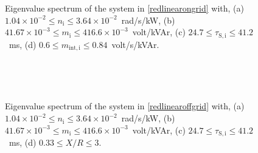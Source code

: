 \documentclass[journal]{IEEEtran}
\begin{document}
\begin{figure}[t]
	\centering
	~
		
	~
	\caption{Eigenvalue spectrum of the system in \eqref{redlinearongrid} with, (a) $1.04\times 10^{-2}\le n_\mathrm{i} \le 3.64\times 10^{-2}$~rad/s/kW, (b) $41.67\times 10^{-3} \le m_\mathrm{i} \le 416.6\times 10^{-3}$~volt/kVAr, (c) $24.7 \le \tau_\mathrm{S,i} \le 41.2$~ms, (d) $0.6 \le m_\mathrm{int,i} \le 0.84$~volt/s/kVAr.}
	\label{fig:locusgrid}
\end{figure}
\begin{figure}[t]
	\centering
	~
		
	~
	\caption{Eigenvalue spectrum of the system in \eqref{redlinearoffgrid} with, (a) $1.04\times 10^{-2}\le n_\mathrm{i} \le 3.64\times 10^{-2}$~rad/s/kW, (b) $41.67\times 10^{-3} \le m_\mathrm{i} \le 416.6\times 10^{-3}$~volt/kVAr, (c) $24.7 \le \tau_\mathrm{S,i} \le 41.2$~ms, (d) $0.33 \le X/R \le 3$.}
	\label{fig:locusisland}
\end{figure}
\end{document}
